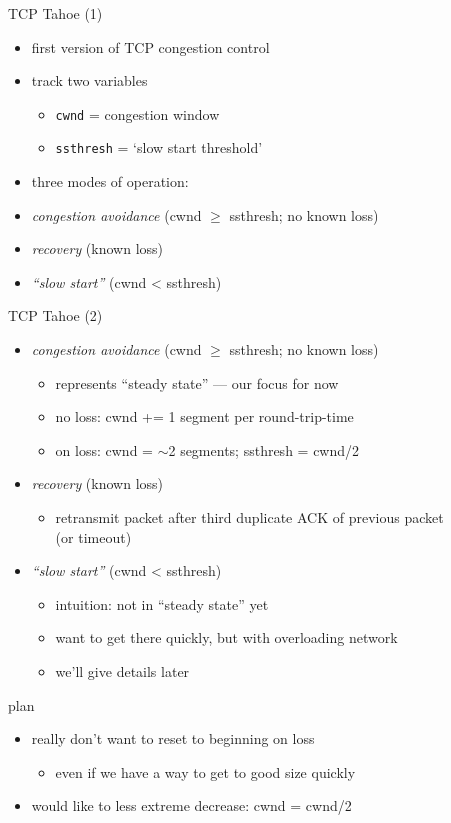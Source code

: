 \begin{frame}{TCP Tahoe (1)}
    \begin{itemize}
    \item first version of TCP congestion control
    \item track two variables
        \begin{itemize}
        \item \texttt{cwnd} = congestion window
        \item \texttt{ssthresh} = `slow start threshold'
        \end{itemize}
    \item three modes of operation:
    \item \textit{congestion avoidance} (cwnd $\ge$ ssthresh; no known loss)
    \item \textit{recovery} (known loss)
    \item \textit{``slow start''} (cwnd < ssthresh)
    \end{itemize}
\end{frame}

\begin{frame}{TCP Tahoe (2)}
    \begin{itemize}
    \item \textit{congestion avoidance} (cwnd $\ge$ ssthresh; no known loss)
        \begin{itemize}
        \item represents ``steady state'' --- our focus for now
        \item no loss: cwnd += 1 segment per round-trip-time
        \item on loss: cwnd = $\sim$2 segments; ssthresh = cwnd/2
        \end{itemize}
    \item \textit{recovery} (known loss)
        \begin{itemize}
        \item retransmit packet after third duplicate ACK of previous packet \\ (or timeout)
        \end{itemize}
    \item \textit{``slow start''} (cwnd < ssthresh)
        \begin{itemize}
        \item intuition: not in ``steady state'' yet
        \item want to get there  quickly, but with overloading network
        \item we'll give details later
        \end{itemize}
    \end{itemize}
\end{frame}

\begin{frame}{plan}
    \begin{itemize}
    \item really don't want to reset to beginning on loss
        \begin{itemize}
        \item even if we have a way to get to good size quickly
        \end{itemize}
    \item would like to less extreme decrease: cwnd = cwnd/2
    \end{itemize}
\end{frame}
